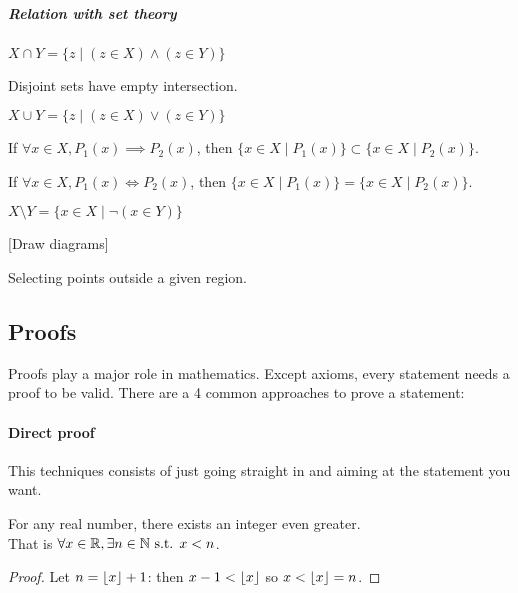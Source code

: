 \subparagraph{Relation with set theory}
\begin{definition}[Intersection]
    $X \cap Y = \{ z \mid (z \in X) \land (z \in Y) \}$
\end{definition}
\begin{remark}
    Disjoint sets have empty intersection.
\end{remark}
\begin{definition}[Union]
    $X \cup Y = \{ z \mid (z \in X) \lor (z \in Y) \}$
\end{definition}
\begin{property}
    If $\forall x \in X, P_1(x) \implies P_2(x)$, then $\{ x \in X \mid P_1(x) \} \subset \{ x \in X \mid P_2(x) \}$.
\end{property}
\begin{property}
    If $\forall x \in X, P_1(x) \iff P_2(x)$, then $\{ x \in X \mid P_1(x) \} = \{ x \in X \mid P_2(x) \}$.
\end{property}
\begin{definition}
    $X \setminus Y = \{ x \in X \mid \lnot (x \in Y) \}$
\end{definition}
[Draw diagrams]
\begin{question}
    Selecting points outside a given region.
\end{question}



\subsection{Proofs}
Proofs play a major role in mathematics.
Except axioms, every statement needs a proof to be valid.
There are a 4 common approaches to prove a statement:
\paragraph{Direct proof}
This techniques consists of just going straight in and aiming at the statement you want.
\begin{property}
    For any real number, there exists an integer even greater.\\
    That is $\forall x \in \mathbb{R}, \exists n \in \mathbb{N} \text{ s.t. } x<n$.
\end{property}
\begin{proof}
    Let $n = \lfloor x \rfloor+1$: then $x-1<\lfloor x \rfloor$ so $x<\lfloor x \rfloor=n$.
\end{proof}
